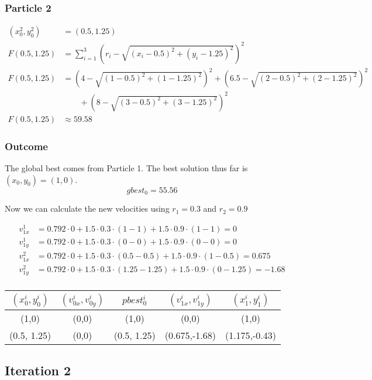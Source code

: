 \documentclass[a4paper]{article}
\begin{document}
\subsubsection{Particle 2}
\begin{align*}
(x_0^2,y_0^2) &= (0.5,1.25)\\
F(0.5,1.25) &= \sum_{i=1}^3(r_i - \sqrt{(x_i-0.5)^2 + (y_i-1.25)^2})^2\\
F(0.5,1.25) &= (4 - \sqrt{ (1-0.5)^2 + (1-1.25)^2 })^2 + (6.5 - \sqrt{ (2-0.5)^2 + (2-1.25)^2 })^2 \\
            &\qquad + (8 - \sqrt{ (3-0.5)^2 + (3-1.25)^2 })^2\\
F(0.5,1.25) &\approx 59.58
\end{align*}

\subsubsection{Outcome}
The global best comes from Particle 1. The best solution thus far is $(x_0, y_0) = (1,0)$.
\[
	gbest_0 = 55.56
\]

Now we can calculate the new velocities using $r_1=0.3$ and $r_2=0.9$

\begin{align*}
v_{1x}^1 &= 0.792\cdot0 + 1.5\cdot0.3\cdot(1-1) + 1.5\cdot0.9\cdot(1-1) = 0\\
v_{1y}^1 &= 0.792\cdot0 + 1.5\cdot0.3\cdot(0-0) + 1.5\cdot0.9\cdot(0-0) = 0\\
v_{1x}^2 &= 0.792\cdot0 + 1.5\cdot0.3\cdot(0.5-0.5) + 1.5\cdot0.9\cdot(1-0.5) = 0.675\\
v_{1y}^2 &= 0.792\cdot0 + 1.5\cdot0.3\cdot(1.25-1.25) + 1.5\cdot0.9\cdot(0-1.25) = -1.68\\
\end{align*}

\begin{center}
    \begin{tabular}{|c|c|c|c|c|}
    \hline
    $(x_0^i,y_0^i)$ & $(v_{0x}^i,v_{0y}^i)$ & $pbest_0^i$ & $(v_{1x}^i,v_{1y}^i)$ & $(x_1^i,y_1^i)$ \\ \hline
    (1,0) & (0,0) & (1,0) & (0,0) & (1,0) \\ \hline
    (0.5, 1.25) & (0,0) & (0.5, 1.25) & (0.675,-1.68) & (1.175,-0.43) \\ \hline
    \end{tabular}
\end{center}

\subsection{Iteration 2}
\end{document}
